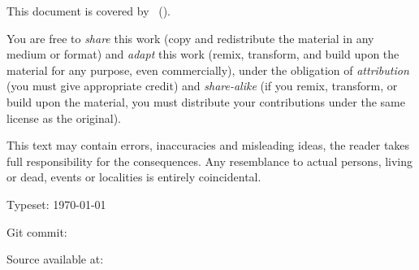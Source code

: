 
{\small
\setlength{\parindent}{0em}
\setlength{\parskip}{1em}

\vspace*{\fill}

\doclicenseIcon%
This document is covered by
\doclicenseLongNameRef%
\ (\doclicenseNameRef).

You are free to
\emph{share} this work (copy and redistribute the material in any medium or format)
and
\emph{adapt} this work (remix, transform, and build upon the material for any purpose, even commercially),
under the obligation of
\emph{attribution} (you must give appropriate credit)
and
\emph{share-alike} (if you remix, transform, or build upon the material, you must distribute your contributions under the same license as the original).

This text may contain errors, inaccuracies and misleading ideas, the reader takes full responsibility for the consequences.
Any resemblance to actual persons, living or dead, events or localities is entirely coincidental.

Typeset: \today

Git commit: \commiturl%

Source available at: \sourcelink%
}
